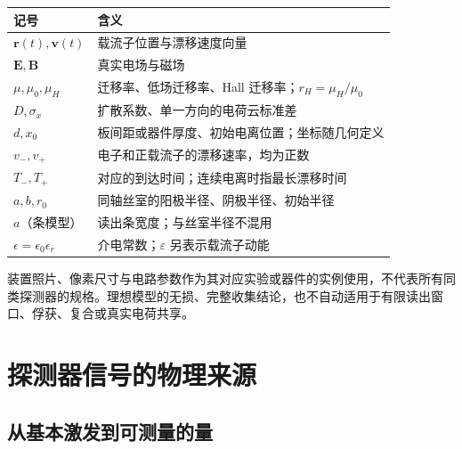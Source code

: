 \documentclass[
  11pt,
  a4paper,
  oneside,
  openany]{report}
\numberwithin{equation}{chapter}
\begin{document}
\begin{longtable}[]{@{}
  >{\raggedright\arraybackslash}p{}
  >{\raggedright\arraybackslash}p{}@{}}
\toprule\noalign{}
\begin{minipage}[b]{\linewidth}\raggedright
记号
\end{minipage} & \begin{minipage}[b]{\linewidth}\raggedright
含义
\end{minipage} \\
\midrule\noalign{}
\endhead
\bottomrule\noalign{}
\endlastfoot
\(\mathbf r(t),\mathbf v(t)\) & 载流子位置与漂移速度向量 \\
\(\mathbf E,\mathbf B\) & 真实电场与磁场 \\
\(\mu,\mu_0,\mu_H\) & 迁移率、低场迁移率、Hall
迁移率；\(r_H=\mu_H/\mu_0\) \\
\(D,\sigma_x\) & 扩散系数、单一方向的电荷云标准差 \\
\(d,x_0\) & 板间距或器件厚度、初始电离位置；坐标随几何定义 \\
\(v_-,v_+\) & 电子和正载流子的漂移速率，均为正数 \\
\(T_-,T_+\) & 对应的到达时间；连续电离时指最长漂移时间 \\
\(a,b,r_0\) & 同轴丝室的阳极半径、阴极半径、初始半径 \\
\(a\)（条模型） & 读出条宽度；与丝室半径不混用 \\
\(\epsilon=\epsilon_0\epsilon_r\) & 介电常数；\(\varepsilon\)
另表示载流子动能 \\
\end{longtable}

装置照片、像素尺寸与电路参数作为其对应实验或器件的实例使用，不代表所有同类探测器的规格。理想模型的无损、完整收集结论，也不自动适用于有限读出窗口、俘获、复合或真实电荷共享。

\clearpage
\tableofcontents
\clearpage
{}

\chapter{探测器信号的物理来源}\label{ux63a2ux6d4bux5668ux4fe1ux53f7ux7684ux7269ux7406ux6765ux6e90}

\section{从基本激发到可测量的量}\label{ux4eceux57faux672cux6fc0ux53d1ux5230ux53efux6d4bux91cfux7684ux91cf}
\end{document}
